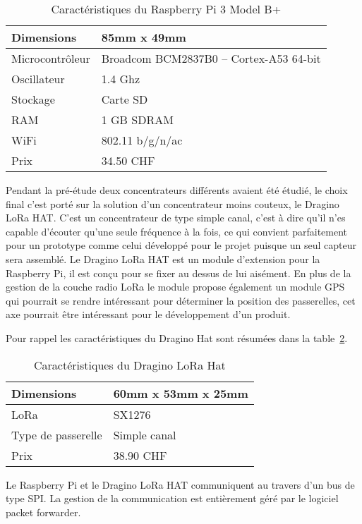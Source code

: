 \begin{table}[htb]
\caption{Caractéristiques du Raspberry Pi 3 Model B+}
\label{tab:raspberry_cara}
\centering
\begin{tabular}{ l | l }
\toprule
Dimensions & 85mm x 49mm \\
\midrule
Microcontrôleur & Broadcom BCM2837B0 – Cortex-A53 64-bit \\
\midrule
Oscillateur & 1.4 Ghz \\
\midrule
Stockage & Carte SD \\
\midrule
RAM & 1 GB SDRAM \\
\midrule
WiFi & 802.11 b/g/n/ac \\
\midrule
Prix & 34.50 CHF\\
\bottomrule 
\end{tabular}
\end{table}

Pendant la pré-étude deux concentrateurs différents avaient été étudié, le choix final c'est porté sur la solution d'un concentrateur moins couteux, le Dragino LoRa HAT. C'est un concentrateur de type simple canal, c'est à dire qu'il n'es capable d'écouter qu'une seule fréquence à la fois, ce qui convient parfaitement pour un prototype comme celui développé pour le projet puisque un seul capteur sera assemblé. Le Dragino LoRa HAT est un module d'extension pour la Raspberry Pi, il est conçu pour se fixer au dessus de lui aisément. En plus de la gestion de la couche radio LoRa le module propose également un module GPS qui pourrait se rendre intéressant pour déterminer la position des passerelles, cet axe pourrait être intéressant pour le développement d'un produit.

Pour rappel les caractéristiques du Dragino Hat sont résumées dans la table~\ref{tab:dragino_cara}.

\begin{table}[htb]
\caption{Caractéristiques du Dragino LoRa Hat}
\label{tab:dragino_cara}
\centering
\begin{tabular}{ l | l }
\toprule
Dimensions & 60mm x 53mm x 25mm \\
\midrule
LoRa & SX1276 \\
\midrule
Type de passerelle & Simple canal \\
\midrule
Prix & 38.90 CHF \\
\bottomrule
\end{tabular}
\end{table}

Le Raspberry Pi et le Dragino LoRa HAT communiquent au travers d'un bus de type SPI. La gestion de la communication est entièrement géré par le logiciel packet forwarder.

